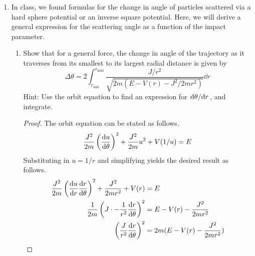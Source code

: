 \documentclass[../psets.tex]{subfiles}
\begin{document}
\begin{enumerate}
\begin{enumerate}
\begin{proof}
            The condition for a real orbit is that
            \begin{equation*}
                \frac{E^2}{4\gamma^2}-\frac{k}{2\gamma} \geq 0
            \end{equation*}
            Simplifying, we obtain
            \begin{align*}
                E^2 &\geq 2\gamma k\\
                E^2 &\geq \frac{J^2k}{m}\\
                E &\geq J\sqrt{\frac{k}{m}} = U_\text{min}
            \end{align*}
            as desired.
        \end{proof}
    \end{enumerate}
    \item In class, we found formulas for the change in angle of particles scattered via a hard sphere potential or an inverse square potential. Here, we will derive a general expression for the scattering angle as a function of the impact parameter.
    \begin{enumerate}
        \item Show that for a general force, the change in angle of the trajectory as it traverses from its smallest to its largest radial distance is given by
        \begin{equation*}
            \Delta\theta = 2\int_{r_\text{min}}^{r_\text{max}}\frac{J/r^2}{\sqrt{2m(E-V(r)-J^2/2mr^2)}}\dd{r}
        \end{equation*}
        Hint: Use the orbit equation to find an expression for $\dv*{\theta}{r}$, and integrate.
        \begin{proof}
            The orbit equation can be stated as follows.
            \begin{equation*}
                \frac{J^2}{2m}\left( \dv{u}{\theta} \right)^2+\frac{J^2}{2m}u^2+V(1/u) = E
            \end{equation*}
            Substituting in $u=1/r$ and simplifying yields the desired result as follows.
            \begin{align*}
                \frac{J^2}{2m}\left( \dv{u}{r}\dv{r}{\theta} \right)^2+\frac{J^2}{2mr^2}+V(r) &= E\\
                \frac{1}{2m}\left( J\cdot-\frac{1}{r^2}\dv{r}{\theta} \right)^2 &= E-V(r)-\frac{J^2}{2mr^2}\\
                \left( \frac{J}{r^2}\dv{r}{\theta} \right)^2 &= 2m(E-V(r)-\frac{J^2}{2mr^2})\\

\end{align*}
\end{proof}
\end{enumerate}
\end{enumerate}
\end{document}

